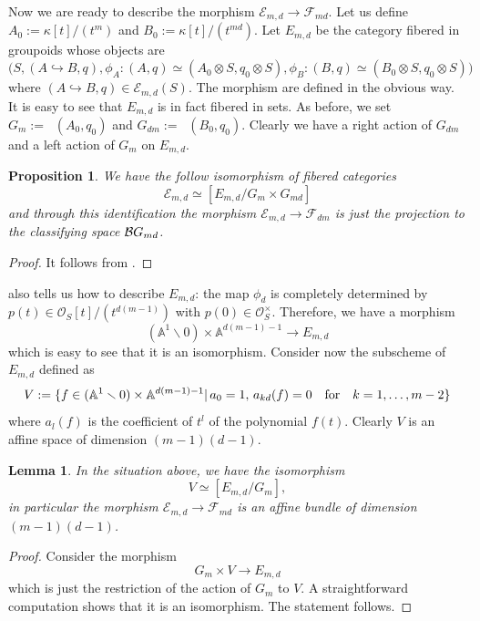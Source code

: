 \documentclass{alggeom}
\numberwithin{equation}{section}
\numberwithin{subsection}{section}
\newtheorem{proposition}[theorem]{Proposition}
\newtheorem{lemma}[theorem]{Lemma}
\theoremstyle{definition}
\theoremstyle{remark}
\newcommand\cE{\mathcal{E}} \newcommand\cF{\mathcal{F}}
\newcommand\cO{\mathcal{O}} \newcommand\cP{\mathcal{P}}
\renewcommand\AA{\mathbb{A}} \newcommand\BB{\mathbb{B}}
\newcommand\into{\hookrightarrow}
\newcommand{\underaut}{\mathop{\underline{\mathrm{Aut}}}\nolimits}
\renewcommand{\setminus}{\smallsetminus}
\begin{document}
Now we are ready to describe the morphism $\cE_{m,d} \rightarrow \cF_{md}$. Let us define $A_0:=\kappa[t]/(t^m)$ and $B_0:=\kappa[t]/(t^{md})$. 
Let $E_{m,d}$ be the category fibered in groupoids whose objects are $$\Big(S,(A\into B,q) ,\phi_A:(A,q)\simeq (A_0\otimes S, q_0 \otimes S), \phi_B: (B,q )\simeq (B_0 \otimes S,q_0\otimes S)\Big)$$ where $(A\into B,q) \in \cE_{m,d}(S)$. The morphism are defined in the obvious way. It is easy to see that $E_{m,d}$ is in fact fibered in sets. As before, we set $G_m:=\underaut(A_0,q_0)$ and $G_{dm}:=\underaut(B_0,q_0)$. Clearly we have a right action of $G_{dm}$ and a left action of $G_m$ on $E_{m,d}$.

\begin{proposition}
	We have the follow isomorphism of fibered categories
	$$ \cE_{m,d} \simeq [E_{m,d}/G_m\times G_{md}]$$ 
	and through this identification the morphism $\cE_{m,d} \rightarrow \cF_{dm}$  is just the projection to the classifying space $\mathcal{B} G_{md}$.
\end{proposition}
\begin{proof}
	It follows from .
\end{proof}

 also tells us how to describe $E_{m,d}$: the map $\phi_d$  is completely determined by $p(t) \in \cO_S[t]/(t^{d(m-1)})$ with $p(0)\in \cO_S^{\times}$. Therefore, we have a morphism 
$$(\AA^1\setminus 0)\times \AA^{d(m-1)-1} \longrightarrow E_{m,d}$$ 
which is easy to see that it is an isomorphism. Consider now the subscheme of $E_{m,d}$ defined as $$V:=\{ f \in (\AA^1\setminus 0)\times \AA^{d(m-1)-1}|\, a_0=1, \, a_{kd}(f)=0\quad {\rm for }\quad k=1,\dots,m-2\}$$
where $a_{l}(f)$ is the coefficient of $t^{l}$ of the polynomial $f(t)$. Clearly $V$ is an affine space of dimension $(m-1)(d-1)$.

\begin{lemma}\label{lem:descr-affine-bundle}
	In the situation above, we have the isomorphism
	$$ V \simeq [E_{m,d}/G_m],$$
	in particular the morphism $\cE_{m,d} \rightarrow \cF_{md}$ is an affine bundle of dimension $(m-1)(d-1)$.
\end{lemma}

\begin{proof}
	Consider the morphism 
	$$ G_m \times V \longrightarrow E_{m,d}$$
	which is just the restriction of the action of $G_m$ to $V$. A straightforward computation shows that it is an isomorphism. The statement follows.
\end{proof}
\end{document}
